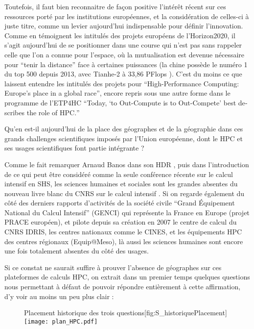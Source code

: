 Toutefois, il faut bien reconnaitre de façon positive l'intérêt récent sur ces ressources porté par les institutions européennes, et la considération de celles-ci à juste titre, comme un levier aujourd'hui indispensable pour définir l'innovation. Comme en témoignent les intitulés des projets européens de l'Horizon2020, il s'agit aujourd'hui de se positionner dans une course qui n'est pas sans rappeler celle que l'on a connue pour l'espace, où la mutualisation est devenue nécessaire pour \enquote{tenir la distance} face à certaines puissances (la chine possède le numéro 1 du top 500 depuis 2013, avec Tianhe-2 à 33,86 PFlops ). C'est du moins ce que laissent entendre les intitulés des projets pour \autocite{HPCHorizon2020} \foreignquote{english}{High-Performance Computing: Europe's place in a global race}, encore repris sous une autre forme dans le programme de l'ETP4HC \autocites{ETP4HPC2012, ETP4HPC2013} \foreignquote{english}{Today, \enquote{to Out-Compute is to Out-Compete} best describes the role of HPC.}

Qu'en est-il aujourd'hui de la place des géographes et de la géographie dans ces grands challenges scientifiques imposés par l'Union européenne, dont le HPC et ses usages scientifiques font partie intégrante ?

Comme le fait remarquer Arnaud Banos dans son HDR \autocite[63]{Banos2013}, puis dans l'introduction de ce qui peut être considéré comme la seule conférence récente sur le calcul intensif en SHS, les sciences humaines et sociales sont les grandes absentes du nouveau livre blanc du CNRS sur le calcul intensif \autocite{COCIN2012}. Si on regarde également du côté des derniers rapports d'activités \autocite{GENCI2014} de la société civile \enquote{Grand Équipement National du Calcul Intensif} (GENCI)  qui représente la France en Europe (projet PRACE européen), et pilote depuis sa création en 2007 le centre de calcul du CNRS IDRIS, les centres nationaux comme le CINES, et les équipements HPC des centres régionaux (Equip@Meso), là aussi les sciences humaines sont encore une fois totalement absentes du côté des usages.

Si ce constat ne saurait suffire à prouver l'absence de géographes sur ces plateformes de calculs HPC, on extrait dans un premier temps quelques questions nous permettant à défaut de pouvoir répondre entièrement à cette affirmation, d'y voir au moins un peu plus clair :

\begin{figure}[h]
\begin{sidecaption}[fortoc]{Placement historique des trois questions}[fig:S_historiquePlacement]
  \centering
 \texttt{[image: plan\_HPC.pdf]}
  \end{sidecaption}
\end{figure}

